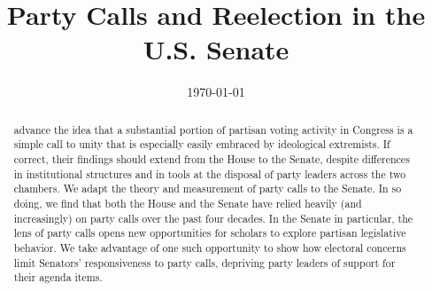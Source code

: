 \documentclass[12pt]{article}
\begin{document}


\title{Party Calls and Reelection in the U.S. Senate
}

\author{
}

\date{\today}

\maketitle

\thispagestyle{empty}
\setcounter{page}{0}

\begin{abstract}
\doublespacing
\noindent
\cite{Minozzi:2013} advance the idea that a substantial portion of partisan voting activity in Congress is a simple call to unity that is especially easily embraced by ideological extremists.  If correct, their findings should extend from the House to the Senate, despite differences in institutional structures and in tools at the disposal of party leaders across the two chambers.  We adapt the theory and measurement of party calls to the Senate.  In so doing, we find that both the House and the Senate have relied heavily (and increasingly) on party calls over the past four decades.  In the Senate in particular, the lens of party calls opens new opportunities for scholars to explore partisan legislative behavior.  We take advantage of one such opportunity to show how electoral concerns limit Senators' responsiveness to party calls, depriving party leaders of support for their agenda items.
\end{abstract}

\clearpage

\doublespacing

\end{document}

